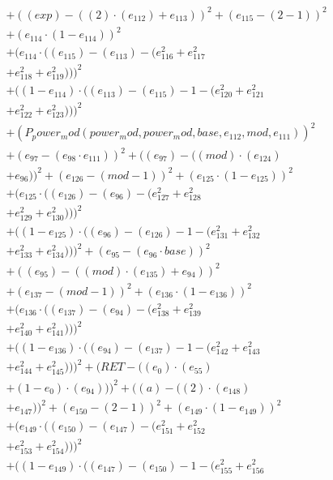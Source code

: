 \documentclass[10pt, a4paper]{article}
\begin{document}
\begin{align*}
& + ((exp) - ((2)  \cdot  (e_{112}) + e_{113}))^{2} + (e_{115} - (2 - 1))^{2} \\
& + (e_{114}  \cdot  (1 - e_{114}))^{2} \\
& + (e_{114}  \cdot  ((e_{115}) - (e_{113}) - (e_{116}^{2} + e_{117}^{2} \\
& + e_{118}^{2} + e_{119}^{2})))^{2} \\
& + ((1 - e_{114})  \cdot  ((e_{113}) - (e_{115}) - 1 - (e_{120}^{2} + e_{121}^{2} \\
& + e_{122}^{2} + e_{123}^{2})))^{2} \\
& + (P_power_mod(power_mod, power_mod, base, e_{112}, mod, e_{111}))^{2} \\
& + (e_{97} - (e_{98}  \cdot  e_{111}))^{2} + ((e_{97}) - ((mod)  \cdot  (e_{124}) \\
& + e_{96}))^{2} + (e_{126} - (mod - 1))^{2} + (e_{125}  \cdot  (1 - e_{125}))^{2} \\
& + (e_{125}  \cdot  ((e_{126}) - (e_{96}) - (e_{127}^{2} + e_{128}^{2} \\
& + e_{129}^{2} + e_{130}^{2})))^{2} \\
& + ((1 - e_{125})  \cdot  ((e_{96}) - (e_{126}) - 1 - (e_{131}^{2} + e_{132}^{2} \\
& + e_{133}^{2} + e_{134}^{2})))^{2} + (e_{95} - (e_{96}  \cdot  base))^{2} \\
& + ((e_{95}) - ((mod)  \cdot  (e_{135}) + e_{94}))^{2} \\
& + (e_{137} - (mod - 1))^{2} + (e_{136}  \cdot  (1 - e_{136}))^{2} \\
& + (e_{136}  \cdot  ((e_{137}) - (e_{94}) - (e_{138}^{2} + e_{139}^{2} \\
& + e_{140}^{2} + e_{141}^{2})))^{2} \\
& + ((1 - e_{136})  \cdot  ((e_{94}) - (e_{137}) - 1 - (e_{142}^{2} + e_{143}^{2} \\
& + e_{144}^{2} + e_{145}^{2})))^{2} + (RET - ((e_{0})  \cdot  (e_{55}) \\
& + (1 - e_{0})  \cdot  (e_{94})))^{2} + ((a) - ((2)  \cdot  (e_{148}) \\
& + e_{147}))^{2} + (e_{150} - (2 - 1))^{2} + (e_{149}  \cdot  (1 - e_{149}))^{2} \\
& + (e_{149}  \cdot  ((e_{150}) - (e_{147}) - (e_{151}^{2} + e_{152}^{2} \\
& + e_{153}^{2} + e_{154}^{2})))^{2} \\
& + ((1 - e_{149})  \cdot  ((e_{147}) - (e_{150}) - 1 - (e_{155}^{2} + e_{156}^{2} \\

\end{align*}
\end{document}
